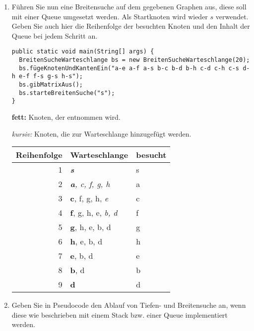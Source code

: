 \documentclass{lehramt-informatik-aufgabe}
\begin{document}
\begin{enumerate}

\item Führen Sie nun eine Breitensuche auf dem gegebenen Graphen aus,
diese soll mit einer Queue umgesetzt werden. Als Startknoten wird wieder
$s$ verwendet. Geben Sie auch hier die Reihenfolge der besuchten Knoten
und den Inhalt der Queue bei jedem Schritt an.

\begin{verbatim}
public static void main(String[] args) {
  BreitenSucheWarteschlange bs = new BreitenSucheWarteschlange(20);
  bs.fügeKnotenUndKantenEin("a-e a-f a-s b-c b-d b-h c-d c-h c-s d-h e-f f-s g-s h-s");
  bs.gibMatrixAus();
  bs.starteBreitenSuche("s");
}
\end{verbatim}

\begin{liAntwort}
\textbf{fett:} Knoten, der entnommen wird.

\textit{kursiv:} Knoten, die zur Warteschlange hinzugefügt werden.

\begin{tabular}{|r|l|l|}
\hline
\textbf{Reihenfolge} & \textbf{Warteschlange} & \textbf{besucht} \\\hline\hline
1 & \textit{\textbf{s}} & s\\\hline
2 & \textit{\textbf{a}, c, f, g, h} & a\\\hline
3 & \textbf{c}, f, g, h, \textit{e} & c\\\hline
4 & \textbf{f}, g, h, e, \textit{b, d} & f\\\hline
5 & \textbf{g}, h, e, b, d & g\\\hline
6 & \textbf{h}, e, b, d & h\\\hline
7 & \textbf{e}, b, d & e\\\hline
8 & \textbf{b}, d & b\\\hline
9 & \textbf{d} & d\\\hline
\end{tabular}
\end{liAntwort}


\item Geben Sie in Pseudocode den Ablauf von Tiefen- und Breitensuche
an, wenn diese wie beschrieben mit einem Stack bzw. einer Queue
implementiert werden.

\end{enumerate}
\end{document}
